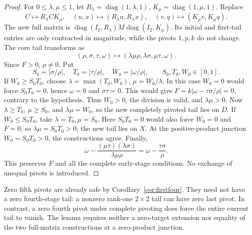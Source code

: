 \documentclass[11pt,reqno]{amsart}
\theoremstyle{definition}
\theoremstyle{remark}
\newcommand{\diag}{\operatorname{diag}}
\begin{document}
\begin{proof}
For \(0\le\lambda,\mu\le1\), let
\(R_\lambda=\diag(1,\lambda,1)\), \(K_\mu=\diag(1,\mu,1)\).
Replace
\[
C\mapsto R_\lambda C K_\mu,\quad
(u,x)\mapsto(R_\lambda u,R_\lambda x),\quad
(v,q)\mapsto(K_\mu v,K_\mu q).
\]
The new full matrix is
\(\diag(I_2,R_\lambda)M\diag(I_2,K_\mu)\).
Its initial and first-tail entries are only contracted in magnitude,
while the pivots \(1,p,k\) do not change.
The core tail transforms as
\begin{equation}\label{eq:sattransform}
(\rho,\sigma,\tau,\omega)
\mapsto(\lambda\mu\rho,\lambda\sigma,\mu\tau,\omega).
\end{equation}
Since \(F>0\), \(\rho\ne0\). Put
\[
S_0=|\sigma/\rho|,\quad T_0=|\tau/\rho|,\quad
W_0=|\omega/\rho|,\qquad S_0,T_0,W_0\in[0,1].
\]
If \(W_0\ge S_0T_0\), choose
\(\lambda=\max(T_0,W_0)\), \(\mu=W_0/\lambda\).
In this case \(W_0=0\) would force \(S_0T_0=0\), hence
\(\omega=0\) and \(\sigma\tau=0\). This would give
\(F=k|\omega-\tau\sigma/\rho|=0\), contrary to the hypothesis.
Thus \(W_0>0\), the division is valid, and \(\lambda\mu>0\).
Now \(\lambda\ge T_0\), \(\mu\ge S_0\), and
\(\lambda\mu=W_0\), so the new completely pivoted tail lies on \(D\).
If \(W_0\le S_0T_0\), take \(\lambda=T_0,\mu=S_0\).
Here \(S_0T_0=0\) would also force \(W_0=0\) and \(F=0\),
so \(\lambda\mu=S_0T_0>0\);
the new tail lies on \(X\). At the positive-product junction
\(W_0=S_0T_0>0\), the constructions agree.
Finally,
\[
\omega-\frac{(\mu\tau)(\lambda\sigma)}{\lambda\mu\rho}
=\omega-\frac{\tau\sigma}{\rho}.
\]
This preserves \(F\) and all the complete early-stage conditions.
No exchange of unequal pivots is introduced.
\end{proof}

Zero fifth pivots are already safe by Corollary~\ref{cor:firstfour}.
They need not have a zero fourth-stage tail: a nonzero rank-one
\(2\times2\) tail can have zero last pivot. In contrast, a zero
fourth pivot under complete pivoting does force the entire current
tail to vanish. The lemma requires neither a zero-target extension
nor equality of the two full-matrix constructions at a zero-product
junction.
\end{document}
